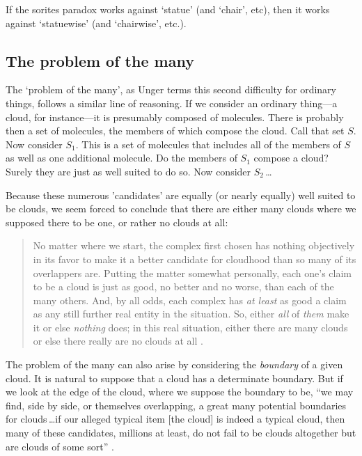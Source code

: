 \documentclass[11pt]{article}
\newenvironment{squote}{%
	\begin{quote}\begin{singlespace}%
	}{%
	\end{singlespace}\end{quote}}
\begin{document}
\begin{spacing}{1.5}
If the sorites paradox works against `statue' (and `chair', etc), then
it works against `statuewise' (and `chairwise', etc.).

\subsection{The problem of the many}
\label{many}
The `problem of the many', as Unger terms this second difficulty for
ordinary things, follows a similar line of reasoning.  If we consider
an ordinary thing---a cloud, for instance---it is presumably composed
of molecules.  There is probably then a set of molecules, the members
of which compose the cloud.  Call that set $S$.  Now consider $S_1$.
This is a set of molecules that includes all of the members of $S$ as
well as one additional molecule.  Do the members of $S_1$ compose a
cloud?  Surely they are just as well suited to do so.  Now consider
$S_2$\,\ldots

Because these numerous 'candidates' are equally (or nearly equally)
well suited to be clouds, we seem forced to conclude that there are
either many clouds where we supposed there to be one, or rather no
clouds at all:

\begin{squote}
No matter where we start, the complex first chosen has nothing
objectively in its favor to make it a better candidate for cloudhood
than so many of its overlappers are.  Putting the matter somewhat
personally, each one's claim to be a cloud is just as good, no better
and no worse, than each of the many others.  And, by all odds, each
complex has \emph{at least} as good a claim as any still further real
entity in the situation.  So, either \emph{all} of \emph{them} make it
or else \emph{nothing} does; in this real situation, either there are
many clouds or else there really are no clouds at all
\citep[415--??]{unger1980a}.
\end{squote}

The problem of the many can also arise by considering the {\em
  boundary} of a given cloud.  It is natural to suppose that a cloud
has a determinate boundary.  But if we look at the edge of the cloud,
where we suppose the boundary to be, ``we may find, side by side, or
themselves overlapping, a great many potential boundaries for
clouds\,\ldots if our alleged typical item {[}the cloud{]} is indeed
a typical cloud, then many of these candidates, millions at least, do
not fail to be clouds altogether but are clouds of some
sort'' \citep[420--421]{unger1980a}.


\end{spacing}
\end{document}
